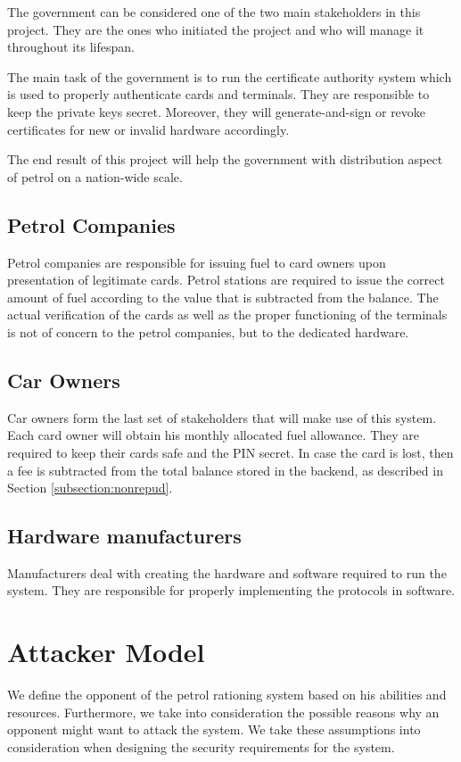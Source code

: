 \documentclass[a4paper,10pt]{llncs}
\begin{document}
The government can be considered one of the two main stakeholders in this project. They are the ones who initiated the project and who will manage it throughout its lifespan.

The main task of the government is to run the certificate authority system which is used to properly authenticate cards and terminals. They are responsible to keep the private keys secret. Moreover, they will generate-and-sign or revoke certificates for new or invalid hardware accordingly.

The end result of this project will help the government with distribution aspect of petrol on a nation-wide scale.

\subsection{Petrol Companies}

Petrol companies are responsible for issuing fuel to card owners upon presentation of legitimate cards. Petrol stations are required to issue the correct amount of fuel according to the value that is subtracted from the balance. The actual verification of the cards as well as the proper functioning of the terminals is not of concern to the petrol companies, but to the dedicated hardware.

\subsection{Car Owners}

Car owners form the last set of stakeholders that will make use of this system. Each card owner will obtain his monthly allocated fuel allowance. They are required to keep their cards safe and the PIN secret. In case the card is lost, then a fee is subtracted from the total balance stored in the backend, as described in Section \ref{subsection:nonrepud}.

\subsection{Hardware manufacturers}

Manufacturers deal with creating the hardware and software required to run the system. They are responsible for properly implementing the protocols in software.

\section{Attacker Model}
We define the opponent of the petrol rationing system based on his abilities and resources. Furthermore, we take into consideration the possible reasons why an opponent might want to attack the system. We take these assumptions into consideration when designing the security requirements for the system.
\end{document}
